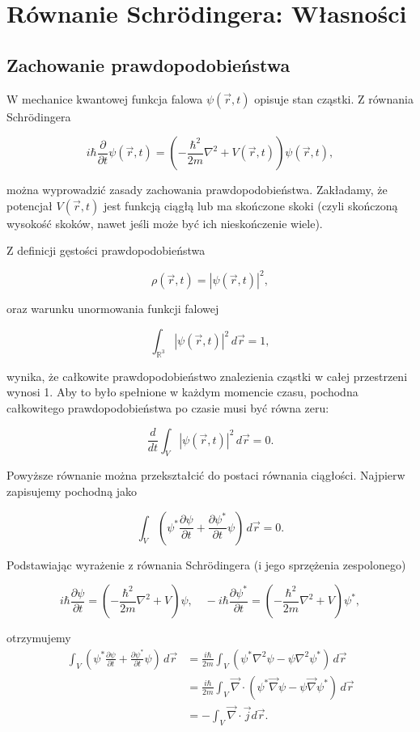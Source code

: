 \section{Równanie Schrödingera: Własności}

\subsection{Zachowanie prawdopodobieństwa}

W mechanice kwantowej funkcja falowa $\psi(\vec{r}, t)$ opisuje stan cząstki. Z równania Schrödingera

$$
i\hbar \frac{\partial}{\partial t} \psi(\vec{r}, t) = \left( -\frac{\hbar^2}{2m} \nabla^2 + V(\vec{r}, t) \right) \psi(\vec{r}, t),
$$

można wyprowadzić zasady zachowania prawdopodobieństwa. Zakładamy, że potencjał $V(\vec{r}, t)$ jest funkcją ciągłą lub ma skończone skoki (czyli skończoną wysokość skoków, nawet jeśli może być ich nieskończenie wiele). 

Z definicji gęstości prawdopodobieństwa

$$
\rho(\vec{r}, t) = |\psi(\vec{r}, t)|^2,
$$

oraz warunku unormowania funkcji falowej

$$
\int_{\mathbb{R}^3} |\psi(\vec{r}, t)|^2 \, d\vec{r} = 1,
$$

wynika, że całkowite prawdopodobieństwo znalezienia cząstki w całej przestrzeni wynosi 1. Aby to było spełnione w każdym momencie czasu, pochodna całkowitego prawdopodobieństwa po czasie musi być równa zeru:

$$
\frac{d}{dt} \int_V |\psi(\vec{r}, t)|^2 \, d\vec{r} = 0.
$$

Powyższe równanie można przekształcić do postaci równania ciągłości. Najpierw zapisujemy pochodną jako

$$
\int_V \left( \psi^* \frac{\partial \psi}{\partial t} + \frac{\partial \psi^*}{\partial t} \psi \right) \, d\vec{r} = 0.
$$

Podstawiając wyrażenie z równania Schrödingera (i jego sprzężenia zespolonego)

$$
i\hbar \frac{\partial \psi}{\partial t} = \left( -\frac{\hbar^2}{2m} \nabla^2 + V \right) \psi, \quad
-i\hbar \frac{\partial \psi^*}{\partial t} = \left( -\frac{\hbar^2}{2m} \nabla^2 + V \right) \psi^*,
$$

otrzymujemy
\begin{align*}
\int_V \left( \psi^* \frac{\partial \psi}{\partial t} + \frac{\partial \psi^*}{\partial t} \psi \right) \, d\vec{r}
&= \frac{i\hbar}{2m} \int_V \left( \psi^* \nabla^2 \psi - \psi \nabla^2 \psi^* \right) \, d\vec{r} \\
&= \frac{i\hbar}{2m} \int_V \vec{\nabla} \cdot \left( \psi^* \vec{\nabla} \psi - \psi \vec{\nabla} \psi^* \right) \, d\vec{r} \\
&= - \int_V \vec{\nabla} \cdot \vec{j} d\vec{r}.
\end{align*}

